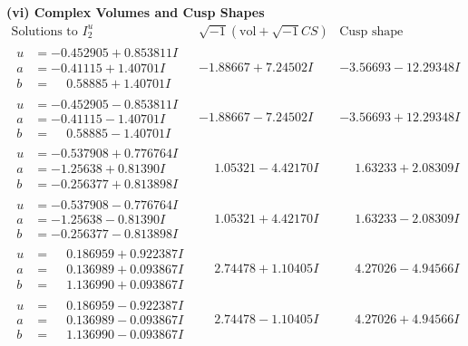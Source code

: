 \documentclass[1p]{elsarticle_modified}
\theoremstyle{definition}
\newcommand{\I}{\sqrt{-1}}
\begin{document}
\newpage\flushleft \textbf{(vi) Complex Volumes and Cusp Shapes}
$$\begin{array}{c|c|c}  
\text{Solutions to }I^u_{2}& \I (\text{vol} + \sqrt{-1}CS) & \text{Cusp shape}\\
 \hline 
\begin{aligned}
u &= -0.452905 + 0.853811 I \\
a &= -0.41115 + 1.40701 I \\
b &= \phantom{-}0.58885 + 1.40701 I\end{aligned}
 & -1.88667 + 7.24502 I & -3.56693 - 12.29348 I \\ \hline\begin{aligned}
u &= -0.452905 - 0.853811 I \\
a &= -0.41115 - 1.40701 I \\
b &= \phantom{-}0.58885 - 1.40701 I\end{aligned}
 & -1.88667 - 7.24502 I & -3.56693 + 12.29348 I \\ \hline\begin{aligned}
u &= -0.537908 + 0.776764 I \\
a &= -1.25638 + 0.81390 I \\
b &= -0.256377 + 0.813898 I\end{aligned}
 & \phantom{-}1.05321 - 4.42170 I & \phantom{-}1.63233 + 2.08309 I \\ \hline\begin{aligned}
u &= -0.537908 - 0.776764 I \\
a &= -1.25638 - 0.81390 I \\
b &= -0.256377 - 0.813898 I\end{aligned}
 & \phantom{-}1.05321 + 4.42170 I & \phantom{-}1.63233 - 2.08309 I \\ \hline\begin{aligned}
u &= \phantom{-}0.186959 + 0.922387 I \\
a &= \phantom{-}0.136989 + 0.093867 I \\
b &= \phantom{-}1.136990 + 0.093867 I\end{aligned}
 & \phantom{-}2.74478 + 1.10405 I & \phantom{-}4.27026 - 4.94566 I \\ \hline\begin{aligned}
u &= \phantom{-}0.186959 - 0.922387 I \\
a &= \phantom{-}0.136989 - 0.093867 I \\
b &= \phantom{-}1.136990 - 0.093867 I\end{aligned}
 & \phantom{-}2.74478 - 1.10405 I & \phantom{-}4.27026 + 4.94566 I \\ \hline\begin{aligned}

\end{aligned}
\end{array}$$
\end{document}
